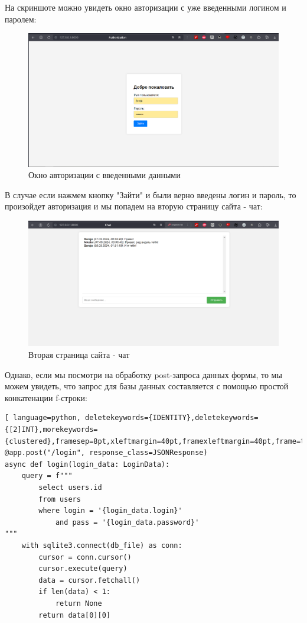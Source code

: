 \documentclass[a4paper,12pt]{diplom}
\begin{document}
	 На скриншоте можно увидеть окно авторизации с уже введенными логином и паролем:
	 
	 \begin{figure}[!ht]
	 	\centering
	 	\includegraphics[width=1\textwidth]{auth.png}
	 	\caption{Окно авторизации с введенными данными}
	 	\label{fig:auth}
	 \end{figure}
	 
	 В случае если нажмем кнопку "Зайти" и были верно введены логин и пароль, то произойдет авторизация и мы попадем на вторую страницу сайта - чат:
	 
	 \begin{figure}[!ht]
	 	\centering
	 	\includegraphics[width=1\textwidth]{chat.png}
	 	\caption{Вторая страница сайта - чат}
	 	\label{fig:chat}
	 \end{figure}
	 
	 Однако, если мы посмотри на обработку post-запроса данных формы, то мы можем увидеть, что запрос для базы данных составляется с помощью простой конкатенации f-строки:
	 \begin{lstlisting}[ language=python, deletekeywords={IDENTITY},deletekeywords={[2]INT},morekeywords={clustered},framesep=8pt,xleftmargin=40pt,framexleftmargin=40pt,frame=tb,framerule=0pt]    
@app.post("/login", response_class=JSONResponse)
async def login(login_data: LoginData):
	query = f"""
		select users.id
		from users
		where login = '{login_data.login}' 
			and pass = '{login_data.password}'
"""
	with sqlite3.connect(db_file) as conn:
		cursor = conn.cursor()
		cursor.execute(query)
		data = cursor.fetchall()
		if len(data) < 1:
			return None
		return data[0][0]
	 \end{lstlisting}
	 
\end{document}
